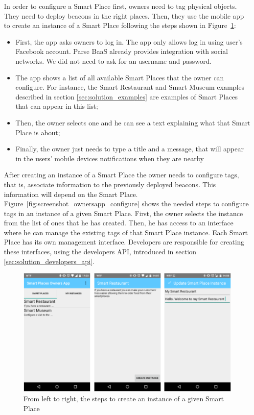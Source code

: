 In order to configure a Smart Place first, owners need to tag physical objects.
They need to deploy beacons in the right places.
Then, they use the mobile app to create an instance of a Smart Place following the steps shown in Figure~\ref{fig:screenshot_ownersapp}:
\begin{itemize}
  \item First, the app asks owners to log in.
  The app only allows log in using user's Facebook account.
  Parse \gls{BaaS} already provides integration with social networks.
  We did not need to ask for an username and password.
  \item The app shows a list of all available Smart Places that the owner can configure.
  For instance, the Smart Restaurant and Smart Museum examples described in section \ref{sec:solution_examples} are examples of Smart Places that can appear in this list;
  \item Then, the owner selects one and he can see a text explaining what that Smart Place is about;
  \item Finally, the owner just needs to type a title and a message, that will appear in the users' mobile devices notifications when they are nearby
\end{itemize}

After creating an instance of a Smart Place the owner needs to configure tags, that is, associate information to the previously deployed beacons.
This information will depend on the Smart Place.
Figure~\ref{fig:screenshot_ownersapp_configure} shows the needed steps to configure tags in an instance of a given Smart Place.
First, the owner selects the instance from the list of ones that he has created.
Then, he has access to an interface where he can manage the existing tags of that Smart Place instance.
Each Smart Place has its own management interface.
Developers are responsible for creating these interfaces, using the developers \gls{API}, introduced in section \ref{sec:solution_developers_api}.

\begin{figure}[!ht]
  \centering
    \includegraphics[width=1\textwidth, keepaspectratio]{images/screenshots/ownersapp}
    \caption[Create a Smart Place Instance]{From left to right, the steps to create an instance of a given Smart Place}
    \label{fig:screenshot_ownersapp}
\end{figure}

